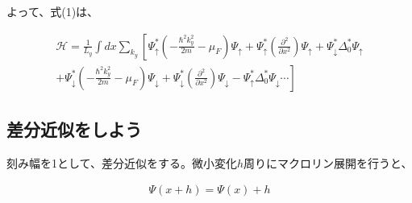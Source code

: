 \documentclass{jsarticle}
\begin{document}
		よって、式(1)は、
		
		\begin{align}
			\mathcal{H}= \frac{1}{L_y}\int dx \sum_{k_y}
			\left[ \Psi_\uparrow^\ast \left( -\frac{\hbar^2k_y^2}{2m}-\mu_F \right)\Psi_\uparrow
			+\Psi_\uparrow^\ast \left( \frac{\partial^2}{\partial x^2}\right)\Psi_\uparrow
			+\Psi_\downarrow^\ast \Delta_0^\ast \Psi_\uparrow \right. \nonumber \\ \left.+
			\Psi_\downarrow^\ast \left( -\frac{\hbar^2k_y^2}{2m}-\mu_F \right)\Psi_\downarrow
			+\Psi_\downarrow^\ast \left( \frac{\partial^2}{\partial x^2} \right) \Psi_\downarrow
			-\Psi_\uparrow^\ast \Delta_0^\ast \Psi_\downarrow \cdots
			\right] 
		\end{align}
		
		\subsection{差分近似をしよう}
		刻み幅を1として、差分近似をする。微小変化$h$周りにマクロリン展開を行うと、
		
		\begin{align}
			\Psi\left(x+h\right)=\Psi\left(x\right)+h
		\end{align}
		
\end{document}
